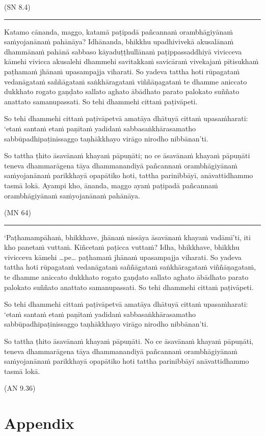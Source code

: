 \documentclass[11pt,oneside]{memoir}
\begin{document}
(SN 8.4)

\noindent\rule{\textwidth}{0.5pt}

Katamo cānanda, maggo, katamā paṭipadā pañcannaṁ orambhāgiyānaṁ saṁyojanānaṁ
pahānāya? Idhānanda, bhikkhu upadhivivekā akusalānaṁ dhammānaṁ pahānā sabbaso
kāyaduṭṭhullānaṁ paṭippassaddhiyā vivicceva kāmehi vivicca akusalehi dhammehi
savitakkaṁ savicāraṁ vivekajaṁ pītisukhaṁ paṭhamaṁ jhānaṁ upasampajja viharati.
So yadeva tattha hoti rūpagataṁ vedanāgataṁ saññāgataṁ saṅkhāragataṁ
viññāṇagataṁ te dhamme aniccato dukkhato rogato gaṇḍato sallato aghato ābādhato
parato palokato suññato anattato samanupassati. So tehi dhammehi cittaṁ
paṭivāpeti.

So tehi dhammehi cittaṁ paṭivāpetvā amatāya dhātuyā cittaṁ upasaṁharati: ‘etaṁ
santaṁ etaṁ paṇītaṁ yadidaṁ sabbasaṅkhārasamatho sabbūpadhipaṭinissaggo
taṇhākkhayo virāgo nirodho nibbānan’ti.

So tattha ṭhito āsavānaṁ khayaṁ pāpuṇāti; no ce āsavānaṁ khayaṁ pāpuṇāti teneva
dhammarāgena tāya dhammanandiyā pañcannaṁ orambhāgiyānaṁ saṁyojanānaṁ parikkhayā
opapātiko hoti, tattha parinibbāyī, anāvattidhammo tasmā lokā. Ayampi kho,
ānanda, maggo ayaṁ paṭipadā pañcannaṁ orambhāgiyānaṁ saṁyojanānaṁ pahānāya.

(MN 64)

\noindent\rule{\textwidth}{0.5pt}

‘Paṭhamampāhaṁ, bhikkhave, jhānaṁ nissāya āsavānaṁ khayaṁ vadāmī’ti, iti kho
panetaṁ vuttaṁ. Kiñcetaṁ paṭicca vuttaṁ? Idha, bhikkhave, bhikkhu vivicceva
kāmehi …pe… paṭhamaṁ jhānaṁ upasampajja viharati. So yadeva tattha hoti
rūpagataṁ vedanāgataṁ saññāgataṁ saṅkhāragataṁ viññāṇagataṁ, te dhamme aniccato
dukkhato rogato gaṇḍato sallato aghato ābādhato parato palokato suññato anattato
samanupassati. So tehi dhammehi cittaṁ paṭivāpeti.

So tehi dhammehi cittaṁ paṭivāpetvā amatāya dhātuyā cittaṁ upasaṁharati: ‘etaṁ
santaṁ etaṁ paṇītaṁ yadidaṁ sabbasaṅkhārasamatho sabbūpadhipaṭinissaggo
taṇhākkhayo virāgo nirodho nibbānan’ti.

So tattha ṭhito āsavānaṁ khayaṁ pāpuṇāti. No ce āsavānaṁ khayaṁ
pāpuṇāti, teneva dhammarāgena tāya dhammanandiyā pañcannaṁ orambhāgiyānaṁ
saṁyojanānaṁ parikkhayā opapātiko hoti tattha parinibbāyī anāvattidhammo tasmā
lokā.

(AN 9.36)

\chapter{Appendix}
\label{sec:org3a06056}
\end{document}
